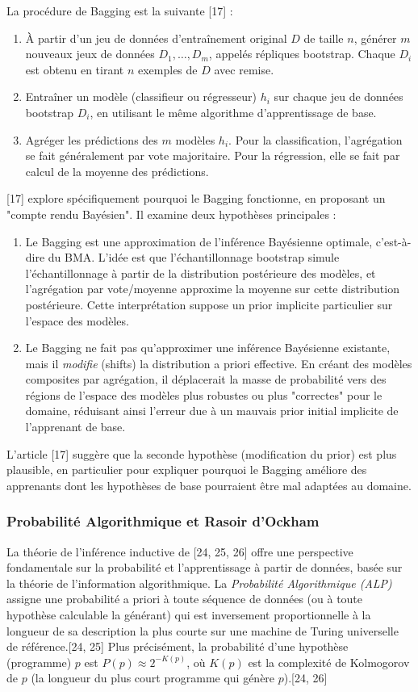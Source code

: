 \documentclass[11pt,a4paper]{article}
\begin{document}
La procédure de Bagging est la suivante [17] :
\begin{enumerate}
    \item À partir d'un jeu de données d'entraînement original $D$ de taille $n$, générer $m$ nouveaux jeux de données $D_1, \dots, D_m$, appelés répliques bootstrap. Chaque $D_i$ est obtenu en tirant $n$ exemples de $D$ avec remise.
    \item Entraîner un modèle (classifieur ou régresseur) $h_i$ sur chaque jeu de données bootstrap $D_i$, en utilisant le même algorithme d'apprentissage de base.
    \item Agréger les prédictions des $m$ modèles $h_i$. Pour la classification, l'agrégation se fait généralement par vote majoritaire. Pour la régression, elle se fait par calcul de la moyenne des prédictions.
\end{enumerate}

\citet{Domingos1997} [17] explore spécifiquement pourquoi le Bagging fonctionne, en proposant un "compte rendu Bayésien". Il examine deux hypothèses principales :
\begin{enumerate}
    \item Le Bagging est une approximation de l'inférence Bayésienne optimale, c'est-à-dire du BMA. L'idée est que l'échantillonnage bootstrap simule l'échantillonnage à partir de la distribution postérieure des modèles, et l'agrégation par vote/moyenne approxime la moyenne sur cette distribution postérieure. Cette interprétation suppose un prior implicite particulier sur l'espace des modèles.
    \item Le Bagging ne fait pas qu'approximer une inférence Bayésienne existante, mais il \textit{modifie} (shifts) la distribution a priori effective. En créant des modèles composites par agrégation, il déplacerait la masse de probabilité vers des régions de l'espace des modèles plus robustes ou plus "correctes" pour le domaine, réduisant ainsi l'erreur due à un mauvais prior initial implicite de l'apprenant de base.
\end{enumerate}
L'article [17] suggère que la seconde hypothèse (modification du prior) est plus plausible, en particulier pour expliquer pourquoi le Bagging améliore des apprenants dont les hypothèses de base pourraient être mal adaptées au domaine.

\subsubsection{Probabilité Algorithmique et Rasoir d'Ockham}
La théorie de l'inférence inductive de \citet{Solomonoff1964} [24, 25, 26] offre une perspective fondamentale sur la probabilité et l'apprentissage à partir de données, basée sur la théorie de l'information algorithmique. La \textit{Probabilité Algorithmique (ALP)} assigne une probabilité a priori à toute séquence de données (ou à toute hypothèse calculable la générant) qui est inversement proportionnelle à la longueur de sa description la plus courte sur une machine de Turing universelle de référence.[24, 25] Plus précisément, la probabilité d'une hypothèse (programme) $p$ est $P(p) \approx 2^{-K(p)}$, où $K(p)$ est la complexité de Kolmogorov de $p$ (la longueur du plus court programme qui génère $p$).[24, 26]
\end{document}
